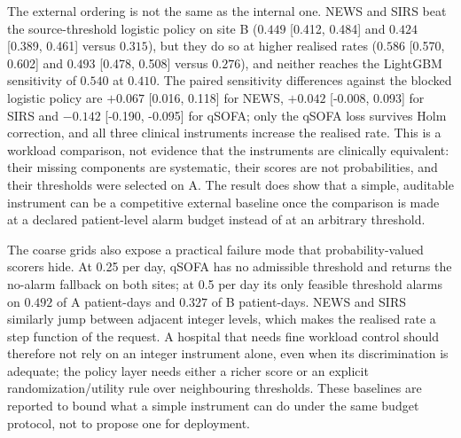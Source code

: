 The external ordering is not the same as the internal one. NEWS and SIRS beat the source-threshold logistic policy on site B ($0.449$ [0.412, 0.484] and $0.424$ [0.389, 0.461] versus $0.315$), but they do so at higher realised rates ($0.586$ [0.570, 0.602] and $0.493$ [0.478, 0.508] versus $0.276$), and neither reaches the LightGBM sensitivity of $0.540$ at $0.410$. The paired sensitivity differences against the blocked logistic policy are $+0.067$ [0.016, 0.118] for NEWS, $+0.042$ [-0.008, 0.093] for SIRS and $-0.142$ [-0.190, -0.095] for qSOFA; only the qSOFA loss survives Holm correction, and all three clinical instruments increase the realised rate. This is a workload comparison, not evidence that the instruments are clinically equivalent: their missing components are systematic, their scores are not probabilities, and their thresholds were selected on A. The result does show that a simple, auditable instrument can be a competitive external baseline once the comparison is made at a declared patient-level alarm budget instead of at an arbitrary threshold.

The coarse grids also expose a practical failure mode that probability-valued scorers hide. At 0.25 per day, qSOFA has no admissible threshold and returns the no-alarm fallback on both sites; at 0.5 per day its only feasible threshold alarms on $0.492$ of A patient-days and $0.327$ of B patient-days. NEWS and SIRS similarly jump between adjacent integer levels, which makes the realised rate a step function of the request. A hospital that needs fine workload control should therefore not rely on an integer instrument alone, even when its discrimination is adequate; the policy layer needs either a richer score or an explicit randomization/utility rule over neighbouring thresholds. These baselines are reported to bound what a simple instrument can do under the same budget protocol, not to propose one for deployment.
